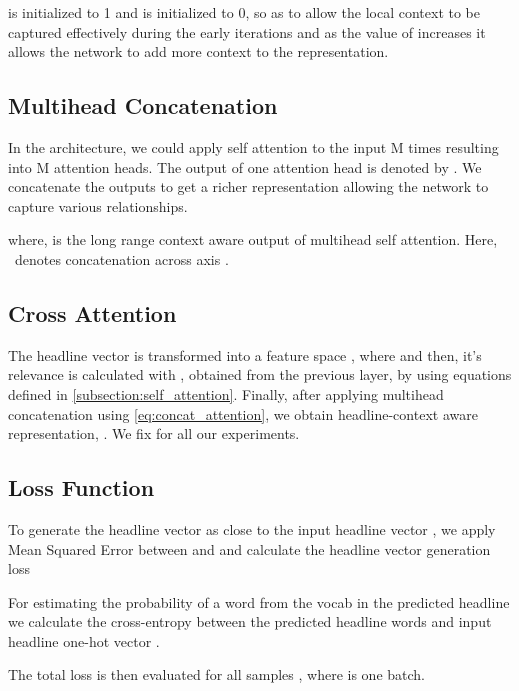 \documentclass[11pt,a4paper]{article}
\begin{document}
 is initialized to 1 and  is initialized to 0, so as to allow the local context to be captured effectively during the early iterations and as the value of  increases it allows the network to add more context to the representation.
\subsection{Multihead Concatenation}
In the architecture, we could apply self attention to the input  M times resulting into M attention heads. The output of one attention head is denoted by . We concatenate the outputs  to get a richer representation allowing the network to capture various relationships.

where,  is the long range context aware output of multihead self attention. Here, \big\Vert \ denotes concatenation across axis .

\subsection{Cross Attention}
The headline vector is transformed into a feature space , where  and then, it's relevance is calculated with , obtained from the previous layer, by using equations defined in \ref{subsection:self_attention}. Finally, after applying multihead concatenation using \ref{eq:concat_attention}, we obtain headline-context aware representation, . We fix  for all our experiments.





\subsection{Loss Function}
To generate the headline vector  as close to the input headline vector , we apply Mean Squared Error between  and  and calculate the headline vector generation loss 

For estimating the probability of a word from the vocab in the predicted headline we calculate the cross-entropy between the predicted headline words  and input headline one-hot vector .

The total loss  is then evaluated for all samples , where  is one batch.
\end{document}

